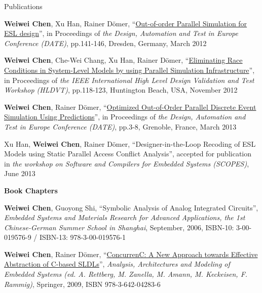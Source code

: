 \documentclass{resume} %
\newcommand{\mypubhl}[6]{
{#1}, {``\href{#2}{#3}''}, {#4}{\textit{#5}}, {#6}
\vspace{-0.5em}
}
\newcommand{\mypub}[5]{
{#1}, {{``#2''}}, {#3}{\textit{#4}}, {#5}
\vspace{-0.5em}
}
\begin{document}
\begin{rSection}{Publications}
\begin{enumerate}
{	
\item
	\mypubhl
	{\textbf{Weiwei Chen}, Xu Han, Rainer D\"{o}mer}
	{http://www.cecs.uci.edu/~doemer/publications/DATE_12.pdf}
	{Out-of-order Parallel Simulation for ESL design}
	{in Proceedings of }
	{the Design, Automation and Test in Europe Conference (DATE)}
	{pp.141-146, Dresden, Germany, March 2012}
	
\item
	\mypubhl
	{\textbf{Weiwei Chen}, Che-Wei Chang, Xu Han, Rainer D\"{o}mer}
	{http://www.cecs.uci.edu/~weiweic/publications/HLDVT2012_WC_CC_XH_RD.pdf}
	{Eliminating Race Conditions in System-Level Models by using Parallel Simulation Infrastructure} 
	{in Proceedings of }
	{the IEEE International High Level Design Validation and Test Workshop (HLDVT)}
	{pp.118-123, Huntington Beach, USA, November 2012}
	
	
\item
	\mypubhl
	{\textbf{Weiwei Chen}, Rainer D\"{o}mer} 
	{http://www.cecs.uci.edu/~weiweic/publications/DATE2013_WC_RD.pdf}
	{Optimized Out-of-Order Parallel Discrete Event Simulation Using Predictions}
	{in Proceedings of }
	{the Design, Automation and Test in Europe Conference  (DATE)}
	{pp.3-8, Grenoble, France, March 2013}
	
	
\item
	\mypub
	{Xu Han, \textbf{Weiwei Chen}, Rainer D\"{o}mer}
	{Designer-in-the-Loop Recoding of ESL Models using Static Parallel Access Conflict Analysis}
	{accepted for publication in }
	{the workshop on Software and Compilers for Embedded Systems (SCOPES)}
	{June 2013}%
}
\end{enumerate}

{\textbf{Book Chapters}}
\vspace{-2mm}
\begin{enumerate}
{\small
\item 
	\mypub
	{\textbf{Weiwei Chen}, Guoyong Shi}
	{Symbolic Analysis of Analog Integrated Circuits}
	{}
	{Embedded Systems and Materials Research for Advanced Applications, the 1st Chinese-German Summer School in Shanghai}
	{September, 2006, ISBN-10: 3-00-019576-9 / ISBN-13: 978-3-00-019576-1}

\item 
	\mypubhl
	{\textbf{Weiwei Chen}, Rainer D\"{o}mer}
	{http://link.springer.com/chapter/10.1007/978-3-642-04284-3_6}
	{ConcurrenC: A New Approach towards Effective Abstraction of C-based SLDLs}
	{}
	{Analysis, Architectures and Modeling of Embedded Systems (ed. A. Rettberg, M. Zanella, M. Amann, M. Keckeisen, F. Rammig)}
	{Springer, 2009, ISBN 978-3-642-04283-6}
}
\end{enumerate}


\end{rSection}
\end{document}
